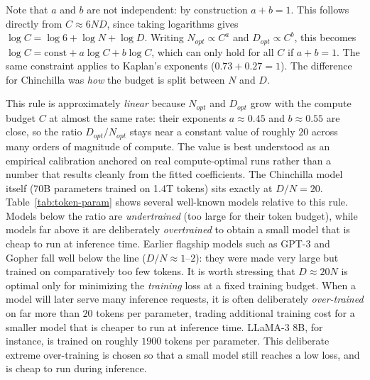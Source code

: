 Note that $a$ and $b$ are not independent: by construction $a+b=1$. This follows directly from $C \approx 6ND$, since taking logarithms gives $\log C = \log 6 + \log N + \log D$. Writing $N_{opt} \propto C^a$ and $D_{opt} \propto C^b$, this becomes $\log C = \text{const} + a \log C + b \log C$, which can only hold for all $C$ if $a+b=1$. The same constraint applies to Kaplan's exponents ($0.73 + 0.27 = 1$). The difference for Chinchilla was \emph{how} the budget is split between $N$ and $D$.


This rule is approximately \emph{linear} because $N_{opt}$ and $D_{opt}$ grow with the compute budget $C$ at almost the same rate: their exponents $a \approx 0.45$ and $b \approx 0.55$ are close, so the ratio $D_{opt}/N_{opt}$ stays near a constant value of roughly $20$ across many orders of magnitude of compute. 
The value is best understood as an empirical calibration anchored on real compute-optimal runs rather than a number that results cleanly from the fitted coefficients. The Chinchilla model itself (70B parameters trained on 1.4T tokens) sits exactly at $D/N = 20$. Table~\ref{tab:token-param} shows several well-known models relative to this rule. Models below the ratio are \emph{undertrained} (too large for their token budget), while models far above it are deliberately \emph{overtrained} to obtain a small model that is cheap to run at inference time. Earlier flagship models such as GPT-3 and Gopher fall well below the line ($D/N \approx 1$--$2$): they were made very large but trained on comparatively too few tokens.
It is worth stressing that $D \approx 20N$ is optimal only for minimizing the \emph{training} loss at a fixed training budget. When a model will later serve many inference requests, it is often deliberately \emph{over-trained} on far more than $20$ tokens per parameter, trading additional training cost for a smaller model that is cheaper to run at inference time. LLaMA-3 8B, for instance, is trained on roughly $1900$ tokens per parameter. This deliberate extreme over-training is chosen so that a small model still reaches a low loss, and is cheap to run during inference. 

